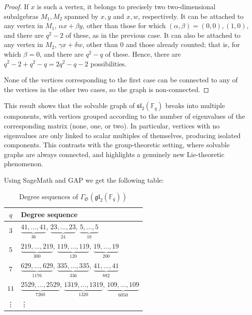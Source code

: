 \documentclass[11pt]{amsart}
\theoremstyle{plain}
\def\F{\mathbb{F}}
\begin{document}
\begin{proof}
If $x$ is such a vertex, it belongs to precisely two two-dimensional subalgebras $M_1, M_2$ spanned by $x,y$ and $x,w$, respectively. It can be attached to any vertex in $M_1$, $\alpha x+\beta y$, other than those for which $(\alpha,\beta)=(0,0),(1,0)$, and there are $q^2-2$ of these, as in the previous case. It can also be attached to any vertex in $M_2$, $\gamma x+ \delta w$, other than $0$ and those already counted; that is, for which $\beta=0$, and there are $q^2-q$ of these. Hence, there are $q^2-2+q^2-q=2q^2-q-2$ possibilities.
\medskip

None of the vertices corresponding to the first case can be connected to any of the vertices in the other two cases, so the graph is non-connected.
\end{proof} 


This result shows that the solvable graph of $\mathfrak{sl}_2(\F_q)$ breaks into multiple components, with vertices grouped according to the number of eigenvalues of the corresponding matrix (none, one, or two). In particular, vertices with no eigenvalues are only linked to scalar multiples of themselves, producing isolated components. This contrasts with the group-theoretic setting, where solvable graphs are always connected, and highlights a genuinely new Lie-theoretic phenomenon.


\quad

Using SageMath and GAP we get the following table:
 
\begin{table}[H]
\centering
\caption{Degree sequences of $\Gamma_{\mathfrak S}(\mathfrak{gl}_2(\F_q))$}
\renewcommand{\arraystretch}{1.25}
\begin{tabular}{c|l}
\hline
$q$ & Degree sequence \\ \hline
$3$  & $\underbrace{41,\ldots, 41}_{36}$, $\underbrace{23,\ldots, 23}_{24}$, $\underbrace{5,\ldots, 5}_{18}$\\[2pt] \hline
$5$  & $\underbrace{219,\ldots, 219}_{300}$, $\underbrace{119,\ldots, 119}_{120}$, $\underbrace{19,\ldots, 19}_{200}$\\[2pt] \hline

$7$  & $\underbrace{629,\ldots, 629}_{1176}$, $\underbrace{335,\ldots, 335}_{336}$, $\underbrace{41,\ldots, 41}_{882}$\\[2pt] \hline

$11$ & $\underbrace{2529,\ldots, 2529}_{7260}$, $\underbrace{1319,\ldots, 1319}_{1320}$, $\underbrace{109,\ldots, 109}_{6050}$\\ \hline
\vdots & \vdots \\ %
\end{tabular}
\end{table}
\end{document}
